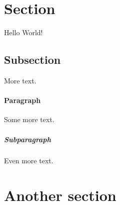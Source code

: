 \documentclass{article}
\begin{document}
	\section{Section}
	Hello World!
	\subsection{Subsection}
	More text.
	\paragraph{Paragraph}
	Some more text.
	\subparagraph{Subparagraph}
	Even more text.
	\section{Another section}
\end{document}
